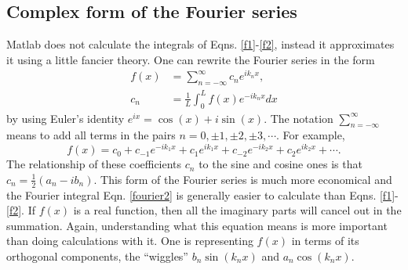 \documentclass[12pt]{article}
\begin{document}
\subsection{Complex form of the Fourier series}
Matlab does not calculate the integrals of Eqns. \ref{f1}-\ref{f2}, instead it approximates it using a little fancier theory. One can rewrite the Fourier series in the form
\begin{align}
  f(x) &= \sum_{n=-\infty}^\infty c_ne^{ik_nx},\\
  c_n &= \frac{1}{L}\int_0^Lf(x)e^{-ik_nx}dx\label{fourier2}
\end{align}
by using Euler's identity $e^{ix} = \cos(x) + i\sin(x)$. The notation $\sum_{n=-\infty}^\infty$ means to add all terms in the pairs $n=0, \pm 1, \pm 2, \pm 3, \cdots$. For example,
\begin{equation}
  f(x) = c_0 + c_{-1}e^{-ik_1x} + c_1e^{ik_1x} + c_{-2}e^{-ik_2x} + c_2e^{ik_2x} + \cdots.
\end{equation}
The relationship of these coefficients $c_n$ to the sine and cosine ones is that $c_n = \frac{1}{2}(a_n - ib_n)$. This form of the Fourier series is much more economical and the Fourier integral Eqn. \ref{fourier2} is generally easier to calculate than Eqns. \ref{f1}-\ref{f2}. If $f(x)$ is a real function, then all the imaginary parts will cancel out in the summation. Again, understanding what this equation means is more important than doing calculations with it. One is representing $f(x)$ in terms of its orthogonal components, the ``wiggles'' $b_n\sin(k_nx)$ and $a_n\cos(k_nx)$.
\end{document}
